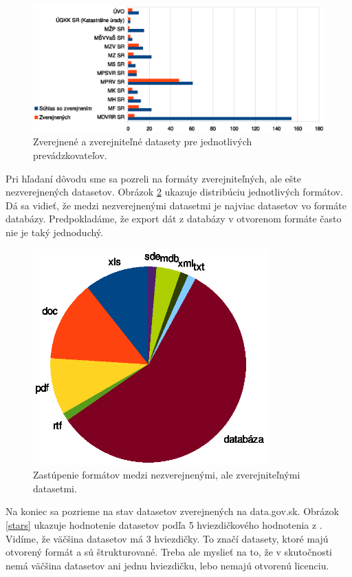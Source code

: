 \documentclass[12pt,a4paper]{article}
\begin{document}
\begin{figure}
\center \includegraphics[width=14cm]{zverejnene_prevadzkovatel}
\caption{Zverejnené a zverejniteľné datasety pre jednotlivých prevádzkovateľov.}
\label{zverejnene}
\end{figure}

Pri hľadaní dôvodu sme sa pozreli na formáty zverejniteľných, ale ešte nezverejnených datasetov. Obrázok \ref{nezverejnene_formaty} ukazuje distribúciu jednotlivých formátov. Dá sa vidieť, že medzi nezverejnenými datasetmi je najviac datasetov vo formáte databázy. Predpokladáme, že export dát z databázy v otvorenom formáte často nie je taký jednoduchý.

\begin{figure}
\center \includegraphics[width=9cm]{nezverejnene_formaty}
\caption{Zastúpenie formátov medzi nezverejnenými, ale zverejniteľnými datasetmi.}
\label{nezverejnene_formaty}
\end{figure}

Na koniec sa pozrieme na stav datasetov zverejnených na data.gov.sk. Obrázok \ref{stars} ukazuje hodnotenie datasetov podľa 5 hviezdičkového hodnotenia z \cite{5star}. Vidíme, že väčšina datasetov má 3 hviezdičky. To značí datasety, ktoré majú otvorený formát a sú štrukturované. Treba ale myslieť na to, že v skutočnosti nemá väčšina datasetov ani jednu hviezdičku, lebo nemajú otvorenú licenciu.
\end{document}
